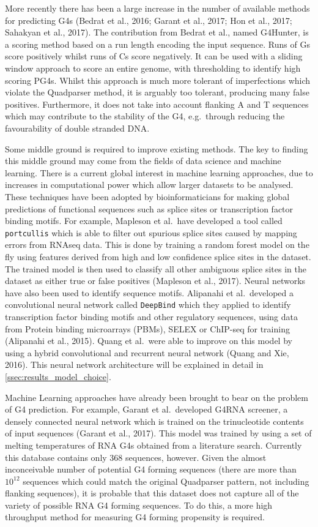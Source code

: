 \documentclass[12pt,a4paper,]{report}
\begin{document}
More recently there has been a large increase in the number of available
methods for predicting G4s (Bedrat et al., 2016; Garant et al., 2017;
Hon et al., 2017; Sahakyan et al., 2017). The contribution from Bedrat
et al., named G4Hunter, is a scoring method based on a run length
encoding the input sequence. Runs of Gs score positively whilst runs of
Cs score negatively. It can be used with a sliding window approach to
score an entire genome, with thresholding to identify high scoring PG4s.
Whilst this approach is much more tolerant of imperfections which
violate the Quadparser method, it is arguably too tolerant, producing
many false positives. Furthermore, it does not take into account
flanking A and T sequences which may contribute to the stability of the
G4, e.g.~through reducing the favourability of double stranded DNA.

Some middle ground is required to improve existing methods. The key to
finding this middle ground may come from the fields of data science and
machine learning. There is a current global interest in machine learning
approaches, due to increases in computational power which allow larger
datasets to be analysed. These techniques have been adopted by
bioinformaticians for making global predictions of functional sequences
such as splice sites or transcription factor binding motifs. For
example, Mapleson et al.~have developed a tool called
\texttt{portcullis} which is able to filter out spurious splice sites
caused by mapping errors from RNAseq data. This is done by training a
random forest model on the fly using features derived from high and low
confidence splice sites in the dataset. The trained model is then used
to classify all other ambiguous splice sites in the dataset as either
true or false positives (Mapleson et al., 2017). Neural networks have
also been used to identify sequence motifs. Alipanahi et al.~developed a
convolutional neural network called \texttt{DeepBind} which they applied
to identify transcription factor binding motifs and other regulatory
sequences, using data from Protein binding microarrays (PBMs), SELEX or
ChIP-seq for training (Alipanahi et al., 2015). Quang et al.~were able
to improve on this model by using a hybrid convolutional and recurrent
neural network (Quang and Xie, 2016). This neural network architecture
will be explained in detail in \autoref{ssec:results_model_choice}.

Machine Learning approaches have already been brought to bear on the
problem of G4 prediction. For example, Garant et al.~developed G4RNA
screener, a densely connected neural network which is trained on the
trinucleotide contents of input sequences (Garant et al., 2017). This
model was trained by using a set of melting temperatures of RNA G4s
obtained from a literature search. Currently this database contains only
368 sequences, however. Given the almost inconceivable number of
potential G4 forming sequences (there are more than \(10^{12}\)
sequences which could match the original Quadparser pattern, not
including flanking sequences), it is probable that this dataset does not
capture all of the variety of possible RNA G4 forming sequences. To do
this, a more high throughput method for measuring G4 forming propensity
is required.
\end{document}
